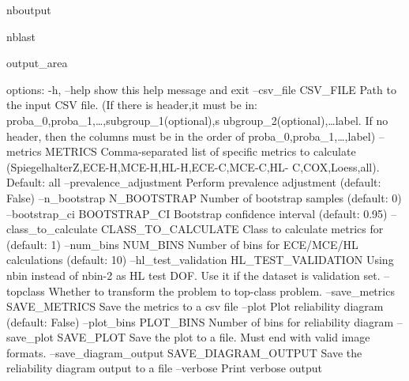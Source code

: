 \documentclass[letterpaper,10pt,english]{sphinxmanual}
\begin{document}
\begin{sphinxuseclass}{nboutput}
\begin{sphinxuseclass}{nblast}
{\begin{sphinxuseclass}{output_area}
\begin{sphinxuseclass}{}
\begin{sphinxVerbatim}[commandchars=\\\{\}]
options:
  -h, --help            show this help message and exit
  --csv\_file CSV\_FILE   Path to the input CSV file. (If there is header,it
                        must be in: proba\_0,proba\_1,{\ldots},subgroup\_1(optional),s
                        ubgroup\_2(optional),{\ldots}label. If no header, then the
                        columns must be in the order of
                        proba\_0,proba\_1,{\ldots},label)
  --metrics METRICS     Comma-separated list of specific metrics to calculate
                        (SpiegelhalterZ,ECE-H,MCE-H,HL-H,ECE-C,MCE-C,HL-
                        C,COX,Loess,all). Default: all
  --prevalence\_adjustment
                        Perform prevalence adjustment (default: False)
  --n\_bootstrap N\_BOOTSTRAP
                        Number of bootstrap samples (default: 0)
  --bootstrap\_ci BOOTSTRAP\_CI
                        Bootstrap confidence interval (default: 0.95)
  --class\_to\_calculate CLASS\_TO\_CALCULATE
                        Class to calculate metrics for (default: 1)
  --num\_bins NUM\_BINS   Number of bins for ECE/MCE/HL calculations (default:
                        10)
  --hl\_test\_validation HL\_TEST\_VALIDATION
                        Using nbin instead of nbin-2 as HL test DOF. Use it if
                        the dataset is validation set.
  --topclass            Whether to transform the problem to top-class problem.
  --save\_metrics SAVE\_METRICS
                        Save the metrics to a csv file
  --plot                Plot reliability diagram (default: False)
  --plot\_bins PLOT\_BINS
                        Number of bins for reliability diagram
  --save\_plot SAVE\_PLOT
                        Save the plot to a file. Must end with valid image
                        formats.
  --save\_diagram\_output SAVE\_DIAGRAM\_OUTPUT
                        Save the reliability diagram output to a file
  --verbose             Print verbose output
\end{sphinxVerbatim}



\end{sphinxuseclass}
\end{sphinxuseclass}
}

\end{sphinxuseclass}
\end{sphinxuseclass}
\end{document}
